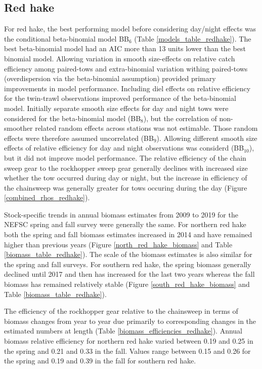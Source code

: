 \documentclass[12pt,letterpaper, leqno]{article}
\begin{document}
\subsection*{Red hake}

For red hake, the best performing model before considering day/night effects was the conditional beta-binomial model BB$_6$ (Table \ref{models_table_redhake}). The best beta-binomial model had an AIC more than 13 units lower than the best binomial model. Allowing variation in smooth size-effects on relative catch efficiency among paired-tows and extra-binomial variation withing paired-tows  (overdispersion via the beta-binomial assumption) provided primary improvements in model performance. Including diel effects on relative efficiency for the twin-trawl observations improved performance of the beta-binomial model. Initially separate smooth size effects for day and night tows were considered for the beta-binomial model (BB$_8$), but the correlation of non-smoother related random effects across stations was not estimable. Those random effects were therefore assumed uncorrelated (BB$_9$). Allowing different smooth size effects of relative efficiency for day and night observations was considerd (BB$_{10}$), but it did not improve model performance. The relative efficiency of the chain sweep gear to the rockhopper sweep gear generally declines with increased size whether the tow occurred during day or night, but the increase in efficiency of the chainsweep was generally greater for tows occuring during the day (Figure \ref{combined_rhos_redhake}).

Stock-specific trends in annual biomass estimates from 2009 to 2019 for the NEFSC spring and fall survey were generally the same. For northern red hake both the spring and fall biomass estimates increased in 2014 and have remained higher than previous years (Figure \ref{north_red_hake_biomass} and Table \ref{biomass_table_redhake}). The scale of the biomass estimates is also similar for the spring and fall surveys. For southern red hake, the spring biomass generally declined until 2017 and then has increased for the last two years whereas the fall biomass has remained relatively stable (Figure \ref{south_red_hake_biomass} and Table \ref{biomass_table_redhake}). 

The efficiency of the rockhopper gear relative to the chainsweep in terms of biomass changes from year to year due primarily to corresponding changes in the estimated numbers at length (Table \ref{biomass_efficiencies_redhake}). Annual biomass relative efficiency for northern red hake varied between 0.19 and 0.25 in the spring and 0.21 and 0.33 in the fall. Values range between 0.15 and 0.26 for the spring and 0.19 and 0.39 in the fall for southern red hake. 
\end{document}
